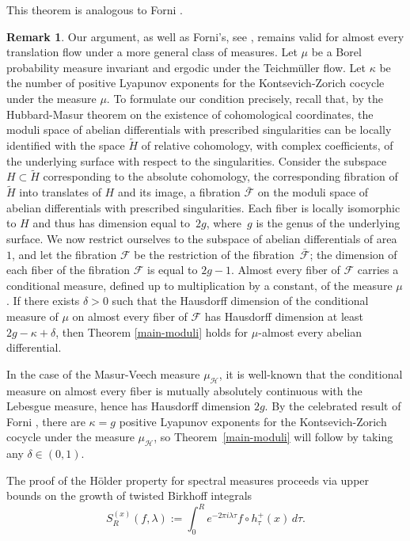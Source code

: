 \documentclass[10pt]{amsart}
\let\mathcal\mathscr
\theoremstyle{plain}
\theoremstyle{definition}
\newtheorem{remark}[theorem]{Remark}
\let\lam\lambda
\newcommand{\Fk}{\mathcal{F}}
\newcommand{\HH}{\mathcal{H}}
\begin{document}
This theorem is analogous to Forni \cite[Cor.\,1.7]{Forni2}.

\begin{remark} \label{remark-main}
Our argument, as well as Forni's, see \cite[Rem.\,1.9]{Forni2}, remains valid for almost every translation flow under a more general class of measures. Let $\mu$ be a Borel probability measure invariant and ergodic under the Teichmüller flow.
Let $\kappa$ be the number of positive Lyapunov exponents for the Kontsevich-Zorich cocycle under the measure $\mu$.
To formulate our condition precisely, recall that, by the Hubbard-Masur theorem on the existence of cohomological coordinates, the moduli space of abelian differentials with prescribed singularities can be locally identified with the space
${\widetilde H}$ of relative cohomology, with complex coefficients, of the underlying surface with respect to the singularities. Consider the subspace $H\subset {\widetilde H}$ corresponding to the absolute cohomology, the corresponding fibration of ${\widetilde H}$ into translates of $H$ and its image, a fibration $\bar{\Fk}$ on the moduli space of abelian differentials with prescribed singularities. Each fiber is locally isomorphic to $H$ and thus has dimension equal to~$2g$, where~$g$ is the genus of the underlying surface. We now restrict ourselves to the subspace of abelian differentials of area $1$, and let the fibration $\Fk$ be the restriction of the fibration~$\bar{\Fk}$; the dimension of each fiber of the fibration $\Fk$ is equal to $2g-1$. Almost every fiber of $\Fk$ carries a conditional measure, defined up to multiplication by a constant, of the measure $\mu$. If there exists
$\delta>0$ such that the Hausdorff dimension of the conditional measure of $\mu$ on almost every fiber of $\Fk$ has Hausdorff dimension at least $2g-\kappa+\delta$, then Theorem \ref{main-moduli} holds for $\mu$-almost every abelian differential.

In the case of the Masur-Veech measure $\mu_\HH$, it is well-known that the conditional measure on almost every fiber is mutually absolutely continuous with the Lebesgue measure, hence has Hausdorff dimension $2g$. By the celebrated result of Forni \cite{Forni}, there are $\kappa=g$ positive Lyapunov exponents for the Kontsevich-Zorich cocycle under the measure $\mu_\HH$, so
Theorem~\ref{main-moduli} will follow by taking any $\delta\in (0,1)$.
\end{remark}

The proof of the Hölder property for spectral measures proceeds via upper bounds on the growth of twisted Birkhoff integrals
\[
S_R^{(x)}(f,\lam) := \int_0^R e^{-2\pi i \lam \tau} f\circ h^+_\tau(x)\,d\tau.
\]
\end{document}

